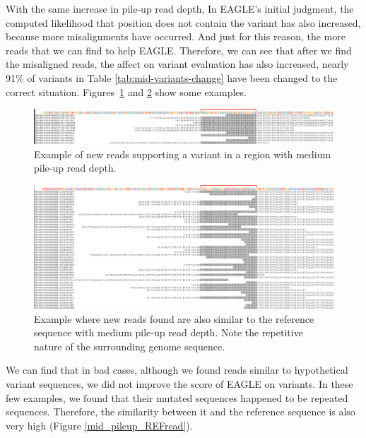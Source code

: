 With the same increase in pile-up read depth, In EAGLE’s initial judgment, the computed likelihood that position does not contain the variant has also increased, because more misalignments have occurred. And just for this reason, the more reads that we can find to help EAGLE. Therefore, we can see that after we find the misaligned reads, the affect on variant evaluation has also increased, nearly 91\% of variants in Table \ref{tab:mid-variants-change} have been changed to the correct situation. Figures~\ref{mid_new_ALTread} and \ref{mid_new_REFread} show some examples.


\begin{figure}[H]
\centering
\includegraphics[width=1\columnwidth]{body/image/mid_new_ALTread.png}
\caption[New reads in a region with medium pile-up read depth]{Example of new reads supporting a variant in a region with medium pile-up read depth.}
\label{mid_new_ALTread}
\end{figure}

\begin{figure}[H]
\centering
\includegraphics[width=1\columnwidth]{body/image/mid_new_REFread.png}
\caption[New reads are similar to the reference with medium pile-up read depth]{Example where new reads found are also similar to the reference sequence with medium pile-up read depth.  Note the repetitive nature of the surrounding genome sequence.}
\label{mid_new_REFread}
\end{figure}

We can find that in bad cases, although we found reads similar to hypothetical variant sequences, we did not improve the score of EAGLE on variants. In these few examples, we found that their mutated sequences happened to be repeated sequences. Therefore, the similarity between it and the reference sequence is also very high (Figure \ref{mid_pileup_REFread}).

